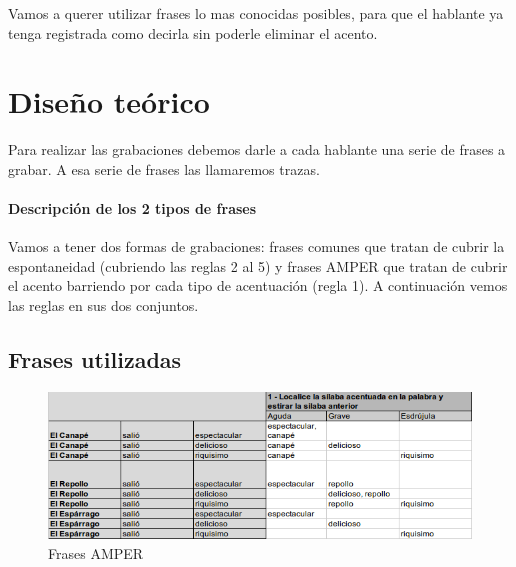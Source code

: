 \documentclass[11pt,a4paper,twoside]{tesis}
\begin{document}
Vamos a querer utilizar frases lo mas conocidas posibles, para que el hablante ya tenga registrada como decirla sin poderle eliminar el acento.

\section{Diseño teórico}

Para realizar las grabaciones debemos darle a cada hablante una serie de frases a grabar. A esa serie de frases las llamaremos trazas.

\paragraph{Descripción de los 2 tipos de frases}

Vamos a tener dos formas de grabaciones: frases comunes que tratan de cubrir la espontaneidad (cubriendo las reglas 2 al 5) y frases AMPER que tratan de cubrir el acento barriendo por cada tipo de acentuación (regla 1). A continuación vemos las reglas en sus dos conjuntos.

\subsection{Frases utilizadas}

\begin{figure}[h!]
    \centerline{\includegraphics[width=1\textwidth]{reglas_AMPER} }
    \caption{Frases AMPER}
    \label{fig21}
\end{figure}
\end{document}
